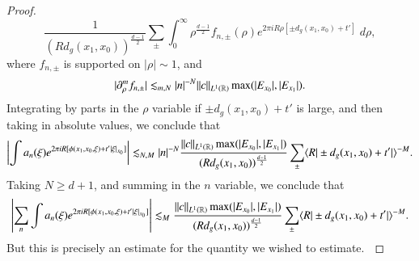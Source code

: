 \begin{proof}
    \[ \frac{1}{\left( R d_g(x_1,x_0) \right)^{\frac{d-1}{2}}} \sum_{\pm} \int_0^\infty \rho^{\frac{d-1}{2}} f_{n,\pm}(\rho) e^{2 \pi i R \rho [ \pm d_g(x_1,x_0) + t' ]}\; d\rho, \]
    where $f_{n,\pm}$ is supported on $|\rho| \sim 1$, and
    \[ |\partial_\rho^m f_{n,\pm}| \lesssim_{m,N} |n|^{-N} \| c \|_{L^1(\operatorname{\mathbb{R}})} \max( |E_{x_0}|, |E_{x_1}| ). \]
    Integrating by parts in the $\rho$ variable if $\pm d_g(x_1,x_0) + t'$ is large, and then taking in absolute values, we conclude that
    \[ \left| \int a_n(\xi) e^{2 \pi i R [ \phi(x_1,x_0,\xi) + t' |\xi|_{x_0} ]} \right| \lesssim_{N,M} |n|^{-N} \frac{\| c \|_{L^1(\operatorname{\mathbb{R}})} \max( |E_{x_0}|, |E_{x_1}| )}{( R d_g(x_1,x_0) )^{\frac{d-1}{2}}} \sum_{\pm} \langle R |\pm d_g(x_1,x_0) + t'| \rangle^{-M}. \]
    Taking $N \geq d + 1$, and summing in the $n$ variable, we conclude that
    \[ \left| \sum_n \int a_n(\xi) e^{2 \pi i R [ \phi(x_1,x_0,\xi) + t' |\xi|_{x_0} ]} \right| \lesssim_M \frac{\| c \|_{L^1(\operatorname{\mathbb{R}})} \max( |E_{x_0}|, |E_{x_1}| )}{( R d_g(x_1,x_0) )^{\frac{d-1}{2}}} \sum_{\pm} \langle R | \pm d_g(x_1,x_0) + t'| \rangle^{-M}. \]
    But this is precisely an estimate for the quantity we wished to estimate. $\qedhere$





\end{proof}
